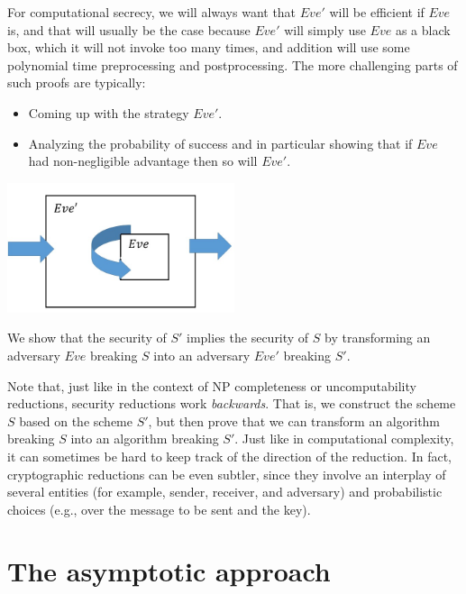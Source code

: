 For computational secrecy, we will always want that \(Eve'\) will be
efficient if \(Eve\) is, and that will usually be the case because
\(Eve'\) will simply use \(Eve\) as a black box, which it will not
invoke too many times, and addition will use some polynomial time
preprocessing and postprocessing. The more challenging parts of such
proofs are typically:

\begin{itemize}
\item
  Coming up with the strategy \(Eve'\).
\item
  Analyzing the probability of success and in particular showing that if
  \(Eve\) had non-negligible advantage then so will \(Eve'\).
\end{itemize}

\begin{marginfigure}
\centering
\includegraphics[width=\linewidth, height=1.5in, keepaspectratio]{../figure/reduction.jpg}
\caption{We show that the security of \(S'\) implies the security of
\(S\) by transforming an adversary \(Eve\) breaking \(S\) into an
adversary \(Eve'\) breaking \(S'\).}
\label{reductiongenfig}
\end{marginfigure}

Note that, just like in the context of NP completeness or
uncomputability reductions, security reductions work \emph{backwards}.
That is, we construct the scheme \(S\) based on the scheme \(S'\), but
then prove that we can transform an algorithm breaking \(S\) into an
algorithm breaking \(S'\). Just like in computational complexity, it can
sometimes be hard to keep track of the direction of the reduction. In
fact, cryptographic reductions can be even subtler, since they involve
an interplay of several entities (for example, sender, receiver, and
adversary) and probabilistic choices (e.g., over the message to be sent
and the key).

\section{The asymptotic approach}\label{2-The-asymptotic-approac}


